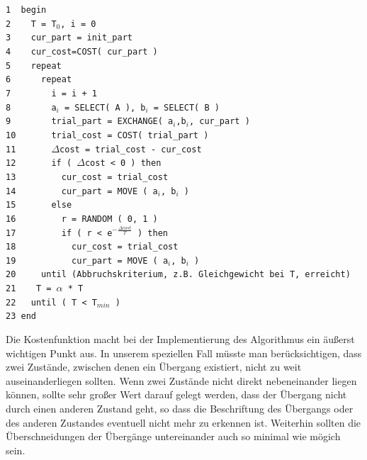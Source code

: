 \noindent
\verb|1  begin|\\
\verb|2    T = T|$_0$\verb|, i = 0|\\
\verb|3    cur_part = init_part|\\
\verb|4    cur_cost=COST( cur_part )|\\
\verb|5    repeat|\\
\verb|6      repeat|\\
\verb|7        i = i + 1|\\
\verb|8        a|$_i$\verb| = SELECT( A ), b|$_i$\verb| = SELECT( B )|\\
\verb|9        trial_part = EXCHANGE( a|$_i$\verb|,b|$_i$\verb|, cur_part )|\\
\verb|10       trial_cost = COST( trial_part )|\\
\verb|11       |$\Delta$\verb|cost = trial_cost - cur_cost|\\
\verb|12       if ( |$\Delta$\verb|cost < 0 ) then|\\
\verb|13         cur_cost = trial_cost|\\
\verb|14         cur_part = MOVE ( a|$_i$\verb|, b|$_i$\verb| )|\\
\verb|15       else|\\
\verb|16         r = RANDOM ( 0, 1 )|\\
\verb|17         if ( r < e|$^{-\frac{\Delta cost}{T}}$\verb| ) then|\\
\verb|18           cur_cost = trial_cost|\\
\verb|19           cur_part = MOVE ( a|$_i$\verb|, b|$_i$\verb| )|\\
\verb|20     until (Abbruchskriterium, z.B. Gleichgewicht bei T, erreicht)|\\
\verb|21    T = |$\alpha$\verb| * T|\\
\verb|22   until ( T < T|$_{min}$\verb| )|\\
\verb|23 end|\\ 
\vspace{10pt}

Die Kostenfunktion macht bei der Implementierung des Algorithmus ein äußerst
wichtigen Punkt aus. In unserem speziellen Fall müsste man berücksichtigen,
dass zwei Zustände, zwischen denen ein Übergang existiert, nicht zu weit
auseinanderliegen sollten. Wenn zwei Zustände nicht direkt nebeneinander liegen
können, sollte sehr großer Wert darauf gelegt werden, dass der Übergang nicht
durch einen anderen Zustand geht, so dass die Beschriftung des Übergangs oder
des anderen Zustandes eventuell nicht mehr zu erkennen ist. Weiterhin sollten
die Überschneidungen der Übergänge untereinander auch so minimal wie mögich
sein. \vspace{10pt}
